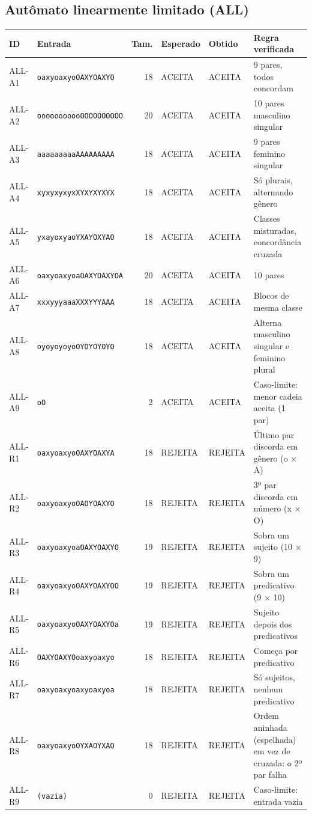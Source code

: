 \subsection*{Autômato linearmente limitado (ALL)}
\begin{longtable}{l p{5.2cm} r l l p{5cm}}
\textbf{ID} & \textbf{Entrada} & \textbf{Tam.} & \textbf{Esperado} & \textbf{Obtido} & \textbf{Regra verificada} \\ \hline \endhead
ALL-A1 & \texttt{oaxyoaxyoOAXYOAXYO} & 18 & ACEITA & ACEITA & 9 pares, todos concordam \\
ALL-A2 & \texttt{ooooooooooOOOOOOOOOO} & 20 & ACEITA & ACEITA & 10 pares masculino singular \\
ALL-A3 & \texttt{aaaaaaaaaAAAAAAAAA} & 18 & ACEITA & ACEITA & 9 pares feminino singular \\
ALL-A4 & \texttt{xyxyxyxyxXYXYXYXYX} & 18 & ACEITA & ACEITA & Só plurais, alternando gênero \\
ALL-A5 & \texttt{yxayoxyaoYXAYOXYAO} & 18 & ACEITA & ACEITA & Classes misturadas, concordância cruzada \\
ALL-A6 & \texttt{oaxyoaxyoaOAXYOAXYOA} & 20 & ACEITA & ACEITA & 10 pares \\
ALL-A7 & \texttt{xxxyyyaaaXXXYYYAAA} & 18 & ACEITA & ACEITA & Blocos de mesma classe \\
ALL-A8 & \texttt{oyoyoyoyoOYOYOYOYO} & 18 & ACEITA & ACEITA & Alterna masculino singular e feminino plural \\
ALL-A9 & \texttt{oO} & 2 & ACEITA & ACEITA & Caso-limite: menor cadeia aceita (1 par) \\
ALL-R1 & \texttt{oaxyoaxyoOAXYOAXYA} & 18 & REJEITA & REJEITA & Último par discorda em gênero (o $\times$ A) \\
ALL-R2 & \texttt{oaxyoaxyoOAOYOAXYO} & 18 & REJEITA & REJEITA & 3º par discorda em número (x $\times$ O) \\
ALL-R3 & \texttt{oaxyoaxyoaOAXYOAXYO} & 19 & REJEITA & REJEITA & Sobra um sujeito (10 $\times$ 9) \\
ALL-R4 & \texttt{oaxyoaxyoOAXYOAXYOO} & 19 & REJEITA & REJEITA & Sobra um predicativo (9 $\times$ 10) \\
ALL-R5 & \texttt{oaxyoaxyoOAXYOAXYOa} & 19 & REJEITA & REJEITA & Sujeito depois dos predicativos \\
ALL-R6 & \texttt{OAXYOAXYOoaxyoaxyo} & 18 & REJEITA & REJEITA & Começa por predicativo \\
ALL-R7 & \texttt{oaxyoaxyoaxyoaxyoa} & 18 & REJEITA & REJEITA & Só sujeitos, nenhum predicativo \\
ALL-R8 & \texttt{oaxyoaxyoOYXAOYXAO} & 18 & REJEITA & REJEITA & Ordem aninhada (espelhada) em vez de cruzada: o 2º par falha \\
ALL-R9 & \texttt{(vazia)} & 0 & REJEITA & REJEITA & Caso-limite: entrada vazia \\
\end{longtable}
